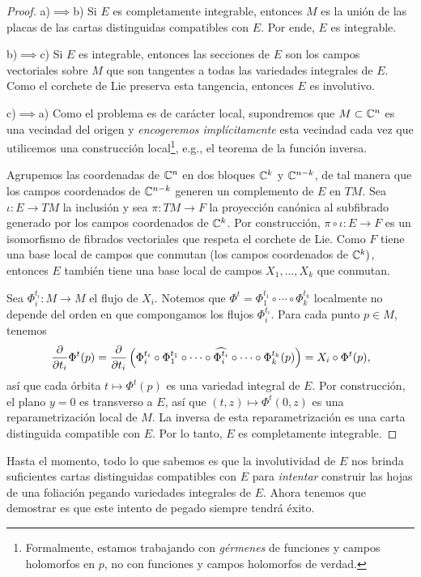 \begin{proof}
a)$\implies$b) Si $E$ es completamente integrable, entonces $M$ es la unión de las placas de las cartas distinguidas compatibles con $E$. Por ende, $E$ es integrable.

b)$\implies$c) Si $E$ es integrable, entonces las secciones de $E$ son los campos vectoriales sobre $M$ que son tangentes a todas las variedades integrales de $E$. Como el corchete de Lie preserva esta tangencia, entonces $E$ es involutivo.

c)$\implies$a) Como el problema es de carácter local, supondremos que $M \subset \mathbb C^n$ es una vecindad del origen y \textit{encogeremos implícitamente} esta vecindad cada vez que utilicemos una construcción local\footnote{Formalmente, estamos trabajando con \textit{gérmenes} de funciones y campos holomorfos en $p$, no con funciones y campos holomorfos de verdad.}, e.g., el teorema de la función inversa.

Agrupemos las coordenadas de $\mathbb C^n$ en dos bloques $\mathbb C^k$ y $\mathbb C^{n-k}$, de tal manera que los campos coordenados de $\mathbb C^{n-k}$ generen un complemento de $E$ en $TM$. Sea $\iota : E \to TM$ la inclusión y sea $\pi : TM \to F$ la proyección canónica al subfibrado generado por los campos coordenados de $\mathbb C^k$. Por construcción, $\pi \circ \iota : E \to F$ es un isomorfismo de fibrados vectoriales que respeta el corchete de Lie. Como $F$ tiene una base local de campos que conmutan (los campos coordenados de $\mathbb C^k)$, entonces $E$ también tiene una base local de campos $X_1, \dots, X_k$ que conmutan.

Sea $\Phi_i^{t_i} : M \to M$ el flujo de $X_i$. Notemos que $\Phi^t = \Phi_1^{t_1} \circ \cdots \circ \Phi_k^{t_k}$ localmente no depende del orden en que compongamos los flujos $\Phi_i^{t_i}$. Para cada punto $p \in M$, tenemos
$$\dfrac \partial {\partial t_i} \Phi^t(p) = \dfrac \partial {\partial t_i} \left( \Phi_i^{t_i} \circ \Phi_1^{t_1} \circ \cdots \circ \widehat {\Phi_i^{t_i}} \circ \cdots \circ \Phi_k^{t_k}(p) \right) = X_i \circ \Phi^t(p),$$
así que cada órbita $t \mapsto \Phi^t(p)$ es una variedad integral de $E$. Por construcción, el plano $y = 0$ es transverso a $E$, así que $(t, z) \mapsto \Phi^t(0, z)$ es una reparametrización local de $M$. La inversa de esta reparametrización es una carta distinguida compatible con $E$. Por lo tanto, $E$ es completamente integrable.
\end{proof}

Hasta el momento, todo lo que sabemos es que la involutividad de $E$ nos brinda suficientes cartas distinguidas compatibles con $E$ para \textit{intentar} construir las hojas de una foliación pegando variedades integrales de $E$. Ahora tenemos que demostrar es que este intento de pegado siempre tendrá éxito.

